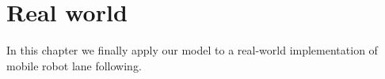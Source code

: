 
\chapter{Real world}\label{chp:realworld}

In this chapter we finally apply our model to a real-world implementation of mobile robot lane
following.
